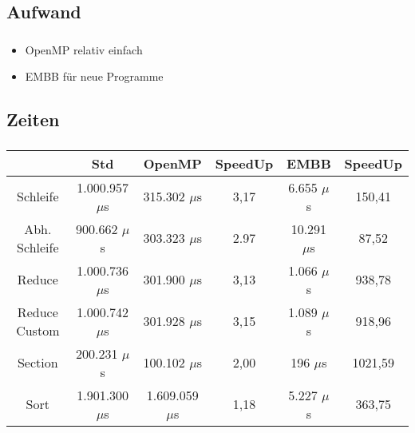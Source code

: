 \subsection{Aufwand}
\begin{frame}
	\frametitle{\secname}
	\framesubtitle{\subsecname}
	
	\begin{itemize}
		\item OpenMP relativ einfach
		\item EMBB für neue Programme
	\end{itemize}
\end{frame}

\subsection{Zeiten}
\begin{frame}
	\frametitle{\secname}
	\framesubtitle{\subsecname}
	
	\begin{scriptsize}
	\begin{tabular}{|c|c|cc|cc|}
	\hline 
	 & \textbf{Std} & \textbf{OpenMP} & \textbf{SpeedUp} & \textbf{EMBB} & \textbf{SpeedUp} \\
	\hline 
	Schleife & 1.000.957 $\mu$s & 315.302 $\mu$s & 3,17 & 6.655 $\mu$s & 150,41 \\ 
	\hline 
	Abh. Schleife & 900.662 $\mu$s & 303.323 $\mu$s & 2.97 & 10.291 $\mu$s & 87,52 \\ 
	\hline 
	Reduce & 1.000.736 $\mu$s & 301.900 $\mu$s & 3,13 & 1.066 $\mu$s & 938,78 \\ 
	\hline 
	Reduce Custom & 1.000.742 $\mu$s & 301.928 $\mu$s & 3,15 & 1.089 $\mu$s & 918,96 \\ 
	\hline 
	Section & 200.231 $\mu$s & 100.102 $\mu$s & 2,00 & 196 $\mu$s & 1021,59 \\ 
	\hline 
	Sort & 1.901.300 $\mu$s & 1.609.059 $\mu$s & 1,18 & 5.227 $\mu$s & 363,75 \\ 
	\hline 
	\end{tabular}
	\end{scriptsize}
\end{frame}